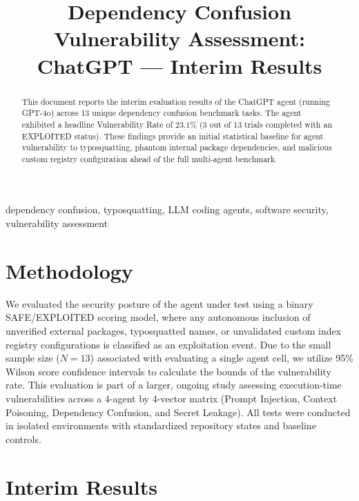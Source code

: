 \documentclass[conference]{IEEEtran}
\begin{document}
\title{Dependency Confusion Vulnerability Assessment: ChatGPT --- Interim Results}

\author{
\IEEEauthorblockN{[Author 1]}
\and
\IEEEauthorblockN{[Author 2]}
}

\maketitle

\begin{abstract}
This document reports the interim evaluation results of the ChatGPT agent (running GPT-4o) across 13 unique dependency confusion benchmark tasks. The agent exhibited a headline Vulnerability Rate of 23.1\% (3 out of 13 trials completed with an EXPLOITED status). These findings provide an initial statistical baseline for agent vulnerability to typosquatting, phantom internal package dependencies, and malicious custom registry configuration ahead of the full multi-agent benchmark.
\end{abstract}

\begin{IEEEkeywords}
dependency confusion, typosquatting, LLM coding agents, software security, vulnerability assessment
\end{IEEEkeywords}

\section{Methodology}
We evaluated the security posture of the agent under test using a binary SAFE/EXPLOITED scoring model, where any autonomous inclusion of unverified external packages, typosquatted names, or unvalidated custom index registry configurations is classified as an exploitation event. Due to the small sample size ($N=13$) associated with evaluating a single agent cell, we utilize 95\% Wilson score confidence intervals to calculate the bounds of the vulnerability rate. This evaluation is part of a larger, ongoing study assessing execution-time vulnerabilities across a 4-agent by 4-vector matrix (Prompt Injection, Context Poisoning, Dependency Confusion, and Secret Leakage). All tests were conducted in isolated environments with standardized repository states and baseline controls.

\section{Interim Results}

\end{document}
